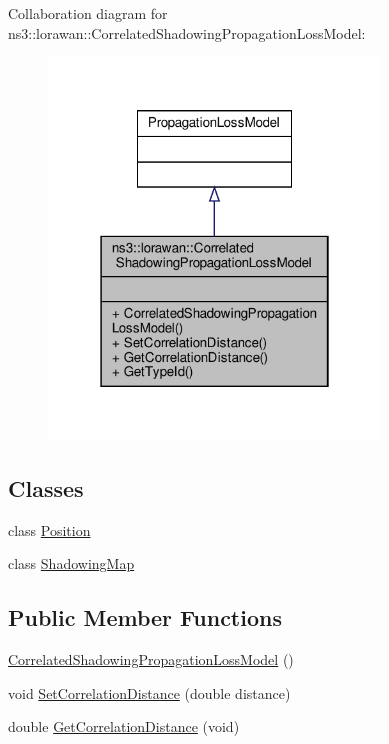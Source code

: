 Collaboration diagram for ns3\+:\+:lorawan\+:\+:Correlated\+Shadowing\+Propagation\+Loss\+Model\+:
\nopagebreak
\begin{figure}[H]
\begin{center}
\leavevmode
\includegraphics[width=250pt]{classns3_1_1lorawan_1_1CorrelatedShadowingPropagationLossModel__coll__graph}
\end{center}
\end{figure}
\subsection*{Classes}
\begin{DoxyCompactItemize}
\item 
class \hyperlink{classns3_1_1lorawan_1_1CorrelatedShadowingPropagationLossModel_1_1Position}{Position}
\item 
class \hyperlink{classns3_1_1lorawan_1_1CorrelatedShadowingPropagationLossModel_1_1ShadowingMap}{Shadowing\+Map}
\end{DoxyCompactItemize}
\subsection*{Public Member Functions}
\begin{DoxyCompactItemize}
\item 
\hyperlink{classns3_1_1lorawan_1_1CorrelatedShadowingPropagationLossModel_a19673646a3b2169c15cd9b751d1d9d96}{Correlated\+Shadowing\+Propagation\+Loss\+Model} ()
\item 
void \hyperlink{classns3_1_1lorawan_1_1CorrelatedShadowingPropagationLossModel_a1553b2a1935dc8e59d3326bee538736c}{Set\+Correlation\+Distance} (double distance)
\item 
double \hyperlink{classns3_1_1lorawan_1_1CorrelatedShadowingPropagationLossModel_a0eef282d061a1acaf38be072da24faa6}{Get\+Correlation\+Distance} (void)
\end{DoxyCompactItemize}
